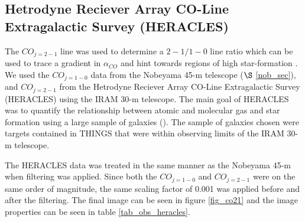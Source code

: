 \subsection{Hetrodyne Reciever Array CO-Line Extragalactic Survey (HERACLES)}

The $CO_{j=2-1}$ line was used to determine a ${2-1} / {1-0}$ line ratio which can be used to trace a gradient in $\alpha_{CO}$ and hint towards regions of high star-formation \citep{reuter1996}.  We used the $CO_{j=1-0}$ data from the Nobeyama 45-m telescope ($\S$ \ref{nob_sec}), and $CO_{j=2-1}$ from the Hetrodyne Reciever Array CO-Line Extragalactic Survey (HERACLES) using the IRAM 30-m telescope.  The main goal of HERACLES was to quantify the relationship between atomic and molecular gas and star formation using a large sample of galaxies (\citep{leroy2009}).  The sample of galaxies chosen were targets contained in THINGS that were within observing limits of the IRAM 30-m telescope.

The HERACLES data was treated in the same manner as the Nobeyama 45-m when filtering was applied.  Since both the $CO_{j=1-0}$ and $CO_{j=2-1}$ were on the same order of magnitude, the same scaling factor of 0.001 was applied before and after the filtering.  The final image can be seen in figure \ref{fig_co21} and the image properties can be seen in table \ref{tab_obs_heracles}.

